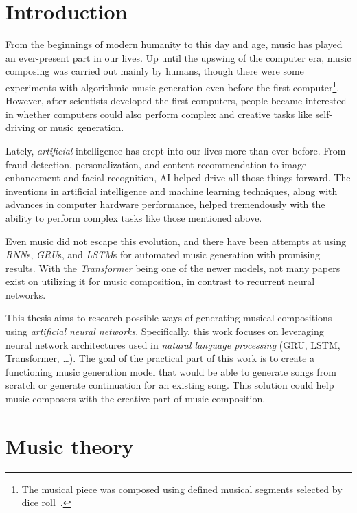 \chapter*{Introduction}\label{ch:introduction}
\setcounter{page}{1}

From the beginnings of modern humanity to this day and age, music has played an ever-present part in our lives.
Up until the upswing of the computer era, music composing was carried out mainly by humans, though there were some experiments with algorithmic music generation even before the first computer\footnote{The musical piece was composed using defined musical segments selected by dice roll~\cite{music-generation-history}.}.
However, after scientists developed the first computers, people became interested in whether computers could also perform complex and creative tasks like self-driving or music generation.

Lately, \textit{artificial} intelligence has crept into our lives more than ever before.
From fraud detection, personalization, and content recommendation to image enhancement and facial recognition, AI helped drive all those things forward.
The inventions in artificial intelligence and machine learning techniques, along with advances in computer hardware performance, helped tremendously with the ability to perform complex tasks like those mentioned above.

Even music did not escape this evolution, and there have been attempts at using \textit{RNN}s, \textit{GRU}s, and \textit{LSTM}s for automated music generation with promising results.
With the \textit{Transformer} being one of the newer models, not many papers exist on utilizing it for music composition, in contrast to recurrent neural networks.

This thesis aims to research possible ways of generating musical compositions using \textit{artificial neural networks}.
Specifically, this work focuses on leveraging neural network architectures used in \textit{natural language processing} (GRU, LSTM, Transformer, \ldots).
The goal of the practical part of this work is to create a functioning music generation model that would be able to generate songs from scratch or generate continuation for an existing song.
This solution could help music composers with the creative part of music composition.



\chapter{Music theory}\label{ch:music-theory}

